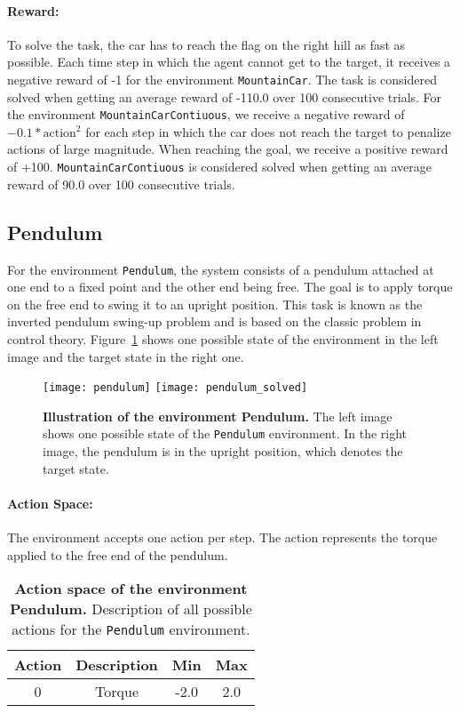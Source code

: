 \paragraph*{Reward:} To solve the task, the car has to reach the flag on the right hill as fast as possible. Each time step in which the agent cannot get to the target, it receives a negative reward of -1 for the environment \verb|MountainCar|. The task is considered solved when getting an average reward of -110.0 over 100 consecutive trials. For the environment \verb|MountainCarContiuous|, we receive a negative reward of $-0.1 * \text{action}^2$ for each step in which the car does not reach the target to penalize actions of large magnitude. When reaching the goal, we receive a positive reward of +100. \verb|MountainCarContiuous| is considered solved when getting an average reward of 90.0 over 100 consecutive trials.

\subsection{Pendulum}
For the environment \verb|Pendulum|, the system consists of a pendulum attached at one end to a fixed point and the other end being free. The goal is to apply torque on the free end to swing it to an upright position. This task is known as the inverted pendulum swing-up problem and is based on the classic problem in control theory. Figure~\ref{fig:pendulum} shows one possible state of the environment in the left image and the target state in the right one.
 \begin{figure}[!ht]
  \centering
\texttt{[image: pendulum]} \hspace*{10mm}
\texttt{[image: pendulum\_solved]}
\caption[Illustration of the environment Pendulum]{
  \textbf{Illustration of the environment Pendulum.}
  The left image shows one possible state of the \texttt{Pendulum} environment. In the right image, the pendulum is in the upright position, which denotes the target state.
}
\label{fig:pendulum}
\end{figure}

\paragraph*{Action Space:} The environment accepts one action per step. The action represents the torque applied to the free end of the pendulum.
\begin{table}[!ht]
  \centering
  \begin{tabular}{ |c|c|c|c| }
    \hline
    Action & Description & Min & Max \\
    \hline
    0 & Torque & -2.0 & 2.0 \\
    \hline
  \end{tabular}
  \caption[Action space of the environment Pendulum]{
    \textbf{Action space of the environment Pendulum.}
    Description of all possible actions for the \texttt{Pendulum} environment.
  }
  \label{table:pendulum_act}
\end{table}

